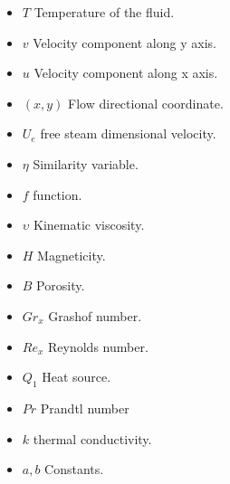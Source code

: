 \documentclass[a4paper,12pt]{report}
\begin{document}
{\begin{itemize}
\item \textbf{$T$}   \hspace{0.5cm} Temperature of the fluid.
\item \textbf{$v$}   \hspace{0.5cm} Velocity component along y axis.
\item \textbf{$u$}   \hspace{0.5cm} Velocity component along x axis.
\item \textbf{$(x,y)$}   \hspace{0.5cm} Flow directional coordinate.
\item \textbf{$U_e$}   \hspace{0.5cm} free steam dimensional velocity.
\item \textbf{$\eta$}   \hspace{0.5cm} Similarity variable.
\item \textbf{$f$}   \hspace{0.5cm} function.
\item \textbf{$\upsilon$}   \hspace{0.5cm} Kinematic viscosity.
\item \textbf{$H$}   \hspace{0.5cm} Magneticity.
\item \textbf{$B$}   \hspace{0.5cm} Porosity.
\item \textbf{$Gr_x$}   \hspace{0.5cm} Grashof number.
\item \textbf{$Re_x$}   \hspace{0.5cm} Reynolds number.
\item \textbf{$Q_1$}   \hspace{0.5cm}  Heat source.
\item \textbf{$Pr$}   \hspace{0.5cm} Prandtl number
\item \textbf{$k$}   \hspace{0.5cm} thermal conductivity.
\item \textbf{$a,b$}   \hspace{0.5cm} Constants.
\end{itemize}
}
\end{document}
